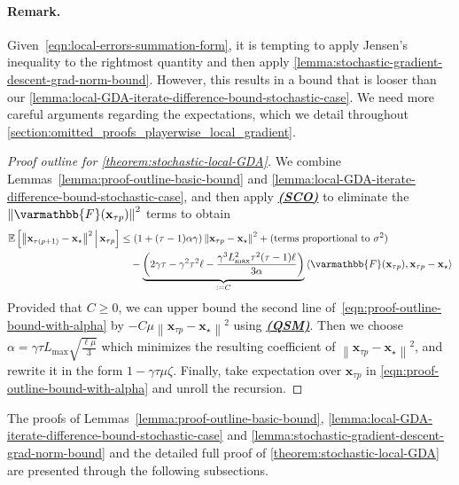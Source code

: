 \documentclass{article}
\newcommand{\vx}{{\mathbf{x}}}
\newcommand{\opF}{{\varmathbb{F}}}
\newcommand{\inprod}[2]{\left\langle #1,#2 \right\rangle}
\newcommand{\sqnorm}[1]{\left\| #1 \right\|^2}
\theoremstyle{plain}
\theoremstyle{remark}
\begin{document}
\paragraph{Remark.} Given~\eqref{eqn:local-errors-summation-form}, it is tempting to apply Jensen's inequality to the rightmost quantity and then apply \cref{lemma:stochastic-gradient-descent-grad-norm-bound}.
However, this results in a bound that is looser than our \cref{lemma:local-GDA-iterate-difference-bound-stochastic-case}.
We need more careful arguments regarding the expectations, which we detail throughout \cref{section:omitted_proofs_playerwise_local_gradient}.

\begin{proof}[Proof outline for \cref{theorem:stochastic-local-GDA}]

We combine Lemmas~\ref{lemma:proof-outline-basic-bound} and \ref{lemma:local-GDA-iterate-difference-bound-stochastic-case}, and then apply \hyperref[assumption:star-cocoercivity]{\textbf{\emph{(SCO)}}} to eliminate the $\sqnorm{\opF(\vx_{\tau p})}$ terms to obtain
\begin{align}
    \begin{split}
    \mathbb{E}\left[\sqnorm{\vx_{\tau (p+1)} - \vx_\star} \,\middle|\, \vx_{\tau p} \right] & \le (1 + (\tau -1)\alpha\gamma) \sqnorm{\vx_{\tau p} - \vx_\star} + (\text{terms proportional to } \sigma^2 ) \\
    & \quad - \underbrace{\left( 2\gamma \tau - \gamma^2 \tau^2 \ell - \frac{\gamma^3 L_{\mathrm{max}}^2 \tau^2 (\tau-1) \ell}{3\alpha} \right)}_{:=C}  \inprod{\opF(\vx_{\tau p})}{\vx_{\tau p}-\vx_\star} 
    \end{split}
    \label{eqn:proof-outline-bound-with-alpha}
\end{align}
Provided that $C\ge 0$, we can upper bound the second line of~\eqref{eqn:proof-outline-bound-with-alpha} by $-C\mu \sqnorm{\vx_{\tau p}- \vx_\star}$ using \hyperref[assumption:quasi-strong-monotonicity]{\textbf{\emph{(QSM)}}}.
Then we choose $\alpha = \gamma\tau L_{\mathrm{max}} \sqrt{\frac{\ell\mu}{3}}$ which minimizes the resulting coefficient of $\sqnorm{\vx_{\tau p}- \vx_\star}$, and rewrite it in the form $1-\gamma\tau\mu\zeta$.
Finally, take expectation over $\vx_{\tau p}$ in \eqref{eqn:proof-outline-bound-with-alpha} and unroll the recursion.
\end{proof}

The proofs of Lemmas~\ref{lemma:proof-outline-basic-bound}, \ref{lemma:local-GDA-iterate-difference-bound-stochastic-case} and \ref{lemma:stochastic-gradient-descent-grad-norm-bound} and the detailed full proof of \cref{theorem:stochastic-local-GDA} are presented through the following subsections.
\end{document}
